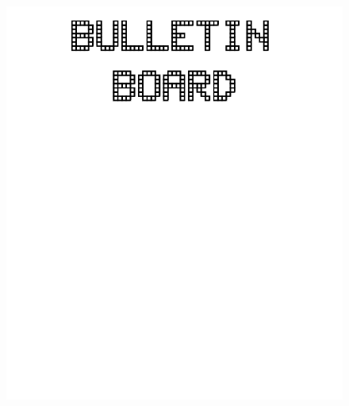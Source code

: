 \documentclass[17pt]{extreport}
\begin{document}
	\begin{figure}
		\centering
		\includegraphics[width=6.25in]{imageserver/uploadimages/bulletinboard.png}
	\end{figure}	
\end{document}
